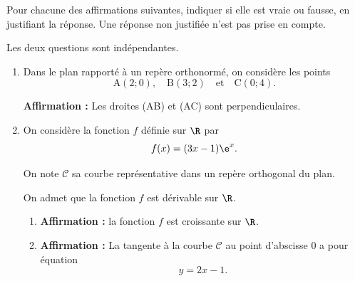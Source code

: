 Pour chacune des affirmations suivantes, indiquer si elle est vraie ou fausse, en justifiant la réponse. Une réponse non justifiée n'est pas prise en compte.

Les deux questions sont indépendantes.

\begin{enumerate}
	\item Dans le plan rapporté à un repère orthonormé, on considère les points
	\[\mathrm{A}(2 ; 0), \quad \mathrm{B}(3 ; 2) \quad \text{et} \quad \mathrm{C}(0 ; 4).\]

	\textbf{Affirmation :} Les droites (AB) et (AC) sont perpendiculaires.

	\item On considère la fonction $f$ définie sur $\R$ par
	\[f(x) = (3x - 1)\e^x.\]

	On note $\mathcal{C}$ sa courbe représentative dans un repère orthogonal du plan.

	On admet que la fonction $f$ est dérivable sur $\R$.

	\begin{enumerate}
		\item \textbf{Affirmation :} la fonction $f$ est croissante sur $\R$.
		\item \textbf{Affirmation :} La tangente à la courbe $\mathcal{C}$ au point d'abscisse $0$ a pour équation
		\[y = 2x - 1.\]
	\end{enumerate}
	\end{enumerate}
